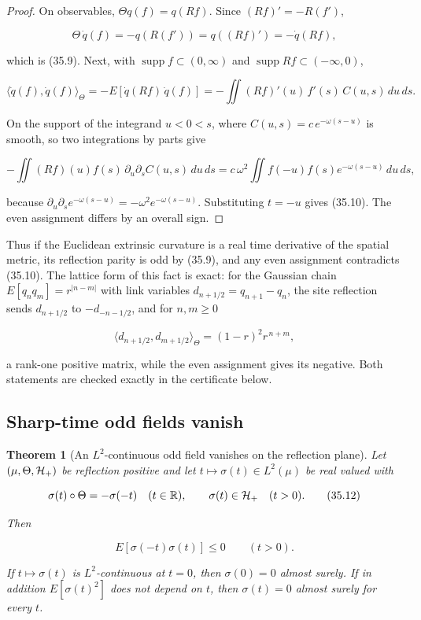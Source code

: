 \documentclass[11pt]{article}
\newtheorem{theorem}{Theorem}[section]
\theoremstyle{remark}
\begin{document}
\begin{proof}
On observables, \(\Theta q(f)=q(Rf)\).  Since \((Rf)'=-R(f')\),

\[
 \Theta\,\dot q(f)=-q(R(f'))=q((Rf)')=-\dot q(Rf),
\]

which is (35.9).  Next, with \(\operatorname{supp}f\subset(0,\infty)\)
and \(\operatorname{supp}Rf\subset(-\infty,0)\),

\[
 \langle\dot q(f),\dot q(f)\rangle_\Theta
 =-E[\dot q(Rf)\,\dot q(f)]
 =-\iint(Rf)'(u)\,f'(s)\,C(u,s)\,du\,ds.
\]

On the support of the integrand \(u<0<s\), where
\(C(u,s)=c\,e^{-\omega(s-u)}\) is smooth, so two integrations by parts
give

\[
 -\iint(Rf)(u)f(s)\,\partial_u\partial_sC(u,s)\,du\,ds
 =c\,\omega^2\iint f(-u)f(s)e^{-\omega(s-u)}\,du\,ds,
\]

because \(\partial_u\partial_s e^{-\omega(s-u)}=-\omega^2e^{-\omega(s-u)}\).
Substituting \(t=-u\) gives (35.10).  The even assignment differs by an
overall sign.
\end{proof}

Thus if the Euclidean extrinsic curvature is a real time derivative of
the spatial metric, its reflection parity is odd by (35.9), and any even
assignment contradicts (35.10).  The lattice form of this fact is exact:
for the Gaussian chain \(E[q_nq_m]=r^{|n-m|}\) with link variables
\(d_{n+1/2}=q_{n+1}-q_n\), the site reflection sends \(d_{n+1/2}\) to
\(-d_{-n-1/2}\), and for \(n,m\geq0\)

\[
 \langle d_{n+1/2},d_{m+1/2}\rangle_\Theta
 =(1-r)^2r^{\,n+m},                                             \tag{35.11}
\]

a rank-one positive matrix, while the even assignment gives its
negative.  Both statements are checked exactly in the certificate below.

\subsection{Sharp-time odd fields vanish}

\begin{theorem}[An \(L^2\)-continuous odd field vanishes on the reflection plane]
\label{thm:v19v32-sharp}
Let \((\mu,\Theta,{\cal H}_+)\) be reflection positive and let
\(t\mapsto\sigma(t)\in L^2(\mu)\) be real valued with

\[
 \sigma(t)\circ\Theta=-\sigma(-t)\quad(t\in\mathbb R),
 \qquad
 \sigma(t)\in{\cal H}_+\quad(t>0).                              \tag{35.12}
\]

Then

\[
 E[\sigma(-t)\sigma(t)]\leq0\qquad(t>0).                        \tag{35.13}
\]

If \(t\mapsto\sigma(t)\) is \(L^2\)-continuous at \(t=0\), then
\(\sigma(0)=0\) almost surely.  If in addition \(E[\sigma(t)^2]\) does
not depend on \(t\), then \(\sigma(t)=0\) almost surely for every
\(t\).
\end{theorem}
\end{document}
